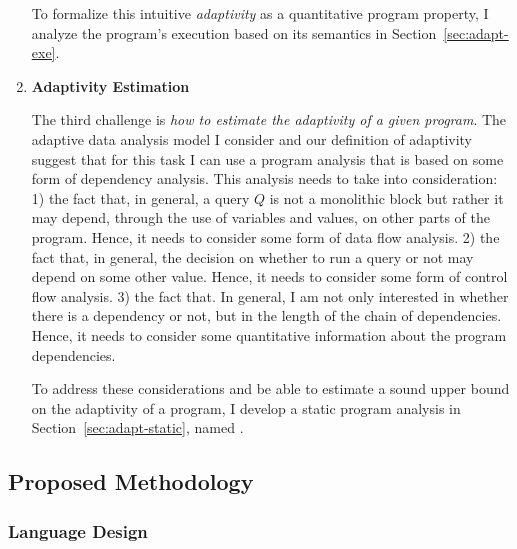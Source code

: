\begin{enumerate}
To formalize this intuitive \emph{adaptivity} as a quantitative program property, 
I analyze the program's execution based on its semantics
in Section~\ref{sec:adapt-exe}.
\item 
\textbf{Adaptivity Estimation}

The third challenge is \emph{how to estimate the adaptivity of a given program}. 
The adaptive data analysis model I consider and our definition of adaptivity suggest that for this task 
I can use a program analysis that is based on some form of dependency analysis.
 This analysis needs to take into consideration:
1) the fact that, in general, a query $Q$ is not a monolithic block but rather it may depend, through the use of variables and values, on other parts of the program. 
Hence, it needs to consider some form of data flow analysis. 
2) the fact that, in general, the decision on whether to run a query or not may depend on some other value. Hence, 
 it needs to consider some form of control flow analysis.
3) the fact that. In general, I am not only interested in whether there is a dependency or not, but in the length of the chain of dependencies. 
Hence, it needs to consider some quantitative information about the program dependencies. %

To address these considerations and be able to estimate a sound upper bound on the adaptivity of a program, 
I develop a static program analysis in Section~\ref{sec:adapt-static}, named {\THESYSTEM}.
\end{enumerate}
%
\subsection{Proposed Methodology}
\label{sec:adapt-intro-overview}

\subsubsection{Language Design}
